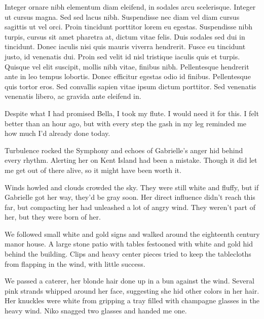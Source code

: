 \documentclass{novel}
\begin{document}
Integer ornare nibh elementum diam eleifend, in sodales arcu scelerisque. Integer ut cursus magna. Sed sed lacus nibh. Suspendisse nec diam vel diam cursus sagittis ut vel orci. Proin tincidunt porttitor lorem eu egestas. Suspendisse nibh turpis, cursus sit amet pharetra at, dictum vitae felis. Duis sodales sed dui in tincidunt. Donec iaculis nisi quis mauris viverra hendrerit. Fusce eu tincidunt justo, id venenatis dui. Proin sed velit id nisl tristique iaculis quis et turpis. Quisque vel elit suscipit, mollis nibh vitae, finibus nibh. Pellentesque hendrerit ante in leo tempus lobortis. Donec efficitur egestas odio id finibus. Pellentesque quis tortor eros. Sed convallis sapien vitae ipsum dictum porttitor. Sed venenatis venenatis libero, ac gravida ante eleifend in. 


\clearpage
\begin{ChapterStart}
\vspace{2\nbs}

\end{ChapterStart}



Despite what I had promised Bella, I took my flute.  I would need it for this.  I felt better than an hour ago, but with every step the gash in my leg reminded me how much I'd already done today.

Turbulence rocked the Symphony and echoes of Gabrielle's anger hid behind every rhythm.  Alerting her on Kent Island had been a mistake.  Though it did let me get out of there alive, so it might have been worth it.

Winds howled and clouds crowded the sky.  They were still white and fluffy, but if Gabrielle got her way, they'd be gray soon.  Her direct influence didn't reach this far, but compacting her had unleashed a lot of angry wind.  They weren't part of her, but they were born of her.

We followed small white and gold signs and walked around the eighteenth century manor house.  A large stone patio with tables festooned with white and gold hid behind the building.  Clips and heavy center pieces tried to keep the tablecloths from flapping in the wind, with little success.

We passed a caterer, her blonde hair done up in a bun against the wind.  Several pink strands whipped around her face, suggesting she hid other colors in her hair.  Her knuckles were white from gripping a tray filled with champagne glasses in the heavy wind.  Niko snagged two glasses and handed me one.
\end{document}
